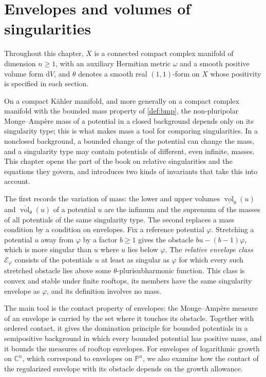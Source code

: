 \chapter{Envelopes and volumes of singularities}
\label{chap:envelopes}

Throughout this chapter, $X$ is a connected compact complex manifold of dimension $n\geq1$, with an auxiliary Hermitian metric $\omega$ and a smooth positive volume form $\mathrm{d}V$, and $\theta$ denotes a smooth real $(1,1)$-form on $X$ whose positivity is specified in each section.

On a compact K\"ahler manifold, and more generally on a compact complex manifold with the bounded mass property of \cref{def:bmp}, the non-pluripolar Monge--Amp\`ere mass of a potential in a closed background depends only on its singularity type; this is what makes mass a tool for comparing singularities. In a nonclosed background, a bounded change of the potential can change the mass, and a singularity type may contain potentials of different, even infinite, masses. This chapter opens the part of the book on relative singularities and the equations they govern, and introduces two kinds of invariants that take this into account.

The first records the variation of mass: the lower and upper volumes $\underline{\operatorname{vol}}_\theta(u)$ and $\overline{\operatorname{vol}}_\theta(u)$ of a potential $u$ are the infimum and the supremum of the masses of all potentials of the same singularity type. The second replaces a mass condition by a condition on envelopes. Fix a reference potential $\varphi$. Stretching a potential $u$ away from $\varphi$ by a factor $b\geq1$ gives the obstacle $bu-(b-1)\varphi$, which is more singular than $u$ where $u$ lies below $\varphi$. The \emph{relative envelope class} $\mathcal E_\varphi$ consists of the potentials $u$ at least as singular as $\varphi$ for which every such stretched obstacle lies above some $\theta$-plurisubharmonic function. This class is convex and stable under finite rooftops, its members have the same singularity envelope as $\varphi$, and its definition involves no mass.

The main tool is the contact property of envelopes: the Monge--Amp\`ere measure of an envelope is carried by the set where it touches its obstacle. Together with ordered contact, it gives the domination principle for bounded potentials in a semipositive background in which every bounded potential has positive mass, and it bounds the measures of rooftop envelopes. For envelopes of logarithmic growth on $\mathbb C^n$, which correspond to envelopes on $\mathbb P^n$, we also examine how the contact of the regularized envelope with its obstacle depends on the growth allowance.

